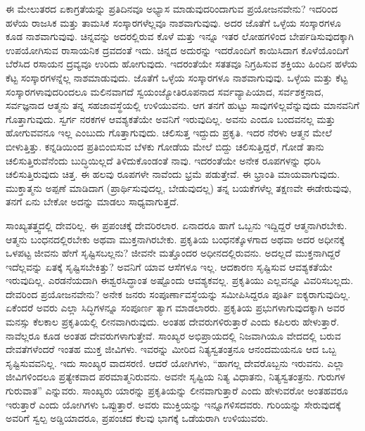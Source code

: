 ಈ ಮೇಲುತರದ ಏಕಾಗ್ರತೆಯನ್ನು ಪ್ರತಿದಿನವೂ ಅಭ್ಯಾಸ ಮಾಡುವುದರಿಂದಾಗುವ ಪ್ರಯೋಜನವೇನು? ಇದರಿಂದ ಹಳೆಯ ರಾಜಸಿಕ ಮತ್ತು ತಾಮಸಿಕ ಸಂಸ್ಕಾರಗಳೆಲ್ಲವೂ ನಾಶವಾಗುವುವು. ಅದರ ಜೊತೆಗೆ ಒಳ್ಳೆಯ ಸಂಸ್ಕಾರಗಳೂ ಕೂಡ ನಾಶವಾಗುವುವು. ಚಿನ್ನವನ್ನು ಅದರಲ್ಲಿರುವ ಕೊಳೆ ಮತ್ತು ಇನ್ನೂ ಇತರ ಲೋಹಗಳಿಂದ ಬೇರ್ಪಡಿಸುವುದಕ್ಕಾಗಿ ಉಪಯೋಗಿಸುವ ರಾಸಾಯನಿಕ ದ್ರವದಂತೆ ಇದು. ಚಿನ್ನದ ಅದುರನ್ನು ಇದರೊಂದಿಗೆ ಕಾಯಿಸಿದಾಗ ಕೊಳೆಯೊಂದಿಗೆ ಬೆರೆಸಿದ ರಸಾಯನ ದ್ರವ್ಯವೂ ಉರಿದು ಹೋಗುವುದು. ಇದರಂತೆಯೇ ಸತತವೂ ನಿಗ್ರಹಿಸುವ ಶಕ್ತಿಯು ಹಿಂದಿನ ಹಳೆಯ ಕೆಟ್ಟ ಸಂಸ್ಕಾರಗಳನ್ನೆಲ್ಲ ನಾಶಮಾಡುವುದು. ಜೊತೆಗೆ ಒಳ್ಳೆಯ ಸಂಸ್ಕಾರಗಳೂ ನಾಶವಾಗುವುವು. ಒಳ್ಳೆಯ ಮತ್ತು ಕೆಟ್ಟ ಸಂಸ್ಕಾರಗಳಾವುದರಿಂದಲೂ ಮಲಿನವಾಗದೆ ಸ್ವಯಂಜ್ಯೋತಿರೂಪನಾದ ಸರ್ವವ್ಯಾಪಿಯಾದ, ಸರ್ವಶಕ್ತನಾದ, ಸರ್ವಜ್ಞನಾದ ಆತ್ಮನು ತನ್ನ ಸಹಜಾವಸ್ಥೆಯಲ್ಲಿ ಉಳಿಯುವನು. ಆಗ ತನಗೆ ಹುಟ್ಟು ಸಾವುಗಳಿಲ್ಲವೆನ್ನುವುದು ಮಾನವನಿಗೆ ಗೊತ್ತಾಗುವುದು. ಸ್ವರ್ಗ ನರಕಗಳ ಆವಶ್ಯಕತೆಯೇ ಅವನಿಗೆ ಇರುವುದಿಲ್ಲ. ಅವನು ಎಂದೂ ಬಂದವನಲ್ಲ ಮತ್ತು ಹೋಗುವವನೂ ಇಲ್ಲ ಎಂಬುದು ಗೊತ್ತಾಗುವುದು. ಚಲಿಸುತ್ತ ಇದ್ದುದು ಪ್ರಕೃತಿ. ಇದರ ನೆರಳು ಆತ್ಮನ ಮೇಲೆ ಬೀಳುತ್ತಿತ್ತು. ಕನ್ನಡಿಯಿಂದ ಪ್ರತಿಬಿಂಬಿಸುವ ಬೆಳಕು ಗೋಡೆಯ ಮೇಲೆ ಬಿದ್ದು ಚಲಿಸುತ್ತಿದ್ದರೆ, ಗೋಡೆ ತಾನು ಚಲಿಸುತ್ತಿರುವೆನೆಂದು ಬುದ್ಧಿಯಿಲ್ಲದೆ ತಿಳಿದುಕೊಂಡಂತೆ ನಾವು. ಇದರಂತೆಯೇ ಅನೇಕ ರೂಪಗಳನ್ನು ಧರಿಸಿ ಚಲಿಸುತ್ತಿರುವುದು ಚಿತ್ತ. ಈ ಹಲವು ರೂಪಗಳೇ ನಾವೆಂದು ಭ್ರಮೆ ಪಡುತ್ತೇವೆ. ಈ ಭ್ರಾಂತಿ ಮಾಯವಾಗುವುದು. ಮುಕ್ತಾತ್ಮನು ಅಪ್ಪಣೆ ಮಾಡಿದಾಗ (ಪ್ರಾರ್ಥಿಸುವುದಲ್ಲ, ಬೇಡುವುದಲ್ಲ) ತನ್ನ ಬಯಕೆಗಳೆಲ್ಲ ತಕ್ಷಣವೇ ಈಡೇರುವುವು, ತನಗೆ ಏನು ಬೇಕೋ ಅದನ್ನು ಮಾಡಲು ಸಾಧ್ಯವಾಗುತ್ತದೆ. 

ಸಾಂಖ್ಯತತ್ತ್ವದಲ್ಲಿ ದೇವರಿಲ್ಲ. ಈ ಪ್ರಪಂಚಕ್ಕೆ ದೇವರಿರಲಾರ. ಏನಾದರೂ ಹಾಗೆ ಒಬ್ಬನು ಇದ್ದಿದ್ದರೆ ಆತ್ಮನಾಗಿರಬೇಕು. ಆತ್ಮನು ಬಂಧನದಲ್ಲಿರಬೇಕು ಅಥವಾ ಮುಕ್ತನಾಗಿರಬೇಕು. ಪ್ರಕೃತಿಯ ಬಂಧನಕ್ಕೊಳಗಾದ ಅಥವಾ ಅದರ ಅಧೀನಕ್ಕೆ ಒಳಪಟ್ಟ ಜೀವನು ಹೇಗೆ ಸೃಷ್ಟಿಸಬಲ್ಲನು? ಜೀವನೇ ಮತ್ತೊಂದರ ಅಧೀನದಲ್ಲಿರುವನು. ಅದಲ್ಲದೆ ಮುಕ್ತನಾಗಿದ್ದರೆ ಇದೆಲ್ಲವನ್ನು ಏತಕ್ಕೆ ಸೃಷ್ಟಿಸಬೇಕಿತ್ತು? ಅವನಿಗೆ ಯಾವ ಆಸೆಗಳೂ ಇಲ್ಲ. ಆದಕಾರಣ ಸೃಷ್ಟಿಸುವ ಆವಶ್ಯಕತೆಯೇ ಇರುವುದಿಲ್ಲ. ಎರಡನೆಯದಾಗಿ ಈಶ್ವರಸಿದ್ಧಾಂತ ಅಷ್ಟೊಂದು ಆವಶ್ಯಕವಲ್ಲ. ಪ್ರಕೃತಿಯು ಎಲ್ಲವನ್ನೂ ವಿವರಿಸಬಲ್ಲದು. ದೇವರಿಂದ ಪ್ರಯೋಜನವೇನು? ಅನೇಕ ಜನರು ಸಂಪೂರ್ಣಾವಸ್ಥೆಯನ್ನು ಸಮೀಪಿಸಿದ್ದರೂ ಪೂರ್ತಿ ಐಕ್ಯರಾಗುವುದಿಲ್ಲ. ಏಕೆಂದರೆ ಅವರು ಎಲ್ಲಾ ಸಿದ್ಧಿಗಳನ್ನೂ ಸಂಪೂರ್ಣ ತ್ಯಾಗ ಮಾಡಲಾರರು. ಪ್ರಕೃತಿಯ ಪ್ರಭುಗಳಾಗುವುದಕ್ಕಾಗಿ ಅವರ ಮನಸ್ಸು ಕೆಲಕಾಲ ಪ್ರಕೃತಿಯಲ್ಲಿ ಲೀನವಾಗಿರುವುದು. ಅಂತಹ ದೇವರುಗಳಿರುತ್ತಾರೆ ಎಂದು ಕಪಿಲರು ಹೇಳುತ್ತಾರೆ. ನಾವೆಲ್ಲರೂ ಕೂಡ ಅಂತಹ ದೇವರುಗಳಾಗುತ್ತೇವೆ. ಸಾಂಖ್ಯರ ಅಭಿಪ್ರಾಯದಲ್ಲಿ ನಿಜವಾಗಿಯೂ ವೇದದಲ್ಲಿ ಬರುವ ದೇವತೆಗಳೆಂದರೆ ಇಂತಹ ಮುಕ್ತ ಜೀವಿಗಳು. ಇವರನ್ನು ಮೀರಿದ ನಿತ್ಯಸ್ವತಂತ್ರನೂ ಆನಂದಮಯನೂ ಆದ ಒಬ್ಬ ಸೃಷ್ಟಿಸುವವನಿಲ್ಲ. ಇದು ಸಾಂಖ್ಯರ ವಾದಸರಣಿ. ಆದರೆ ಯೋಗಿಗಳು, “ಹಾಗಲ್ಲ ದೇವರೊಬ್ಬನು ಇರುವನು. ಎಲ್ಲಾ ಜೀವಿಗಳಿಂದಲೂ ಪ್ರತ್ಯೇಕವಾದ ಪರಮಾತ್ಮನಿರುವನು. ಅವನೇ ಸೃಷ್ಟಿಯ ನಿತ್ಯ ವಿಧಾತನು, ನಿತ್ಯಸ್ವತಂತ್ರನು. ಗುರುಗಳ ಗುರುವಾತ” ಎನ್ನುವರು. ಸಾಂಖ್ಯರು ಯಾರನ್ನು ಪ್ರಕೃತಿಯನ್ನು ಲೀನವಾಗುತ್ತಾರೆ ಎಂದು ಹೇಳುವರೋ ಅಂತಹವರೂ ಇರುತ್ತಾರೆ ಎಂದು ಯೋಗಿಗಳು ಒಪ್ಪುತ್ತಾರೆ. ಅವರು ಮುಕ್ತಿಯನ್ನು ಇನ್ನೂಗಳಿಸದವರು. ಗುರಿಯನ್ನು ಸೇರುವುದಕ್ಕೆ ಅವರಿಗೆ ಸ್ವಲ್ಪ ಅಡ್ಡಿಯಾದರೂ, ಪ್ರಪಂಚದ ಕೆಲವು ಭಾಗಕ್ಕೆ ಒಡೆಯರಾಗಿ ಉಳಿಯುವರು. 

